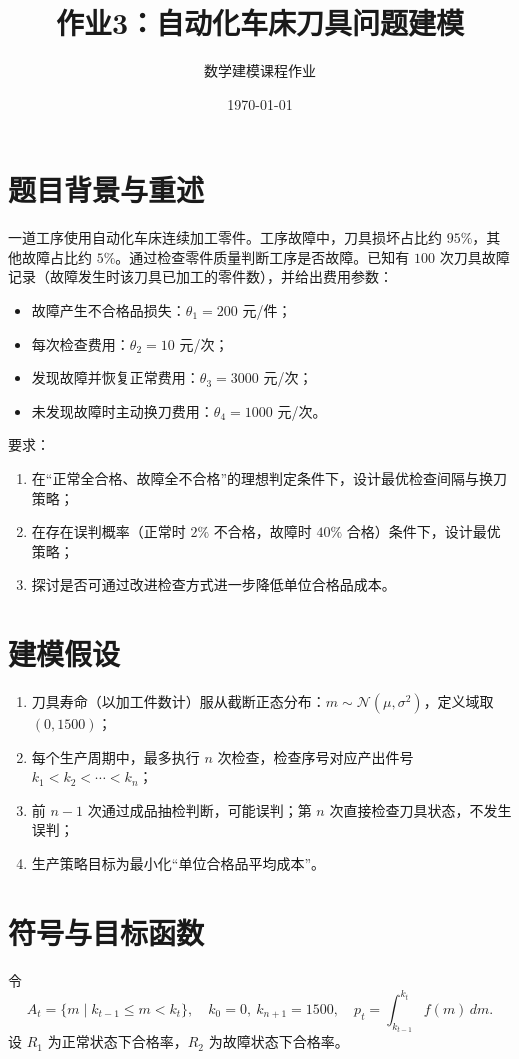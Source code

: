 \documentclass[12pt,a4paper]{ctexart}
\title{作业3：自动化车床刀具问题建模}
\author{数学建模课程作业}
\date{\today}
\begin{document}
\maketitle

\section{题目背景与重述}
一道工序使用自动化车床连续加工零件。工序故障中，刀具损坏占比约 $95\%$，其他故障占比约 $5\%$。通过检查零件质量判断工序是否故障。已知有 $100$ 次刀具故障记录（故障发生时该刀具已加工的零件数），并给出费用参数：
\begin{itemize}
  \item 故障产生不合格品损失：$\theta_1=200$ 元/件；
  \item 每次检查费用：$\theta_2=10$ 元/次；
  \item 发现故障并恢复正常费用：$\theta_3=3000$ 元/次；
  \item 未发现故障时主动换刀费用：$\theta_4=1000$ 元/次。
\end{itemize}

要求：
\begin{enumerate}
  \item 在“正常全合格、故障全不合格”的理想判定条件下，设计最优检查间隔与换刀策略；
  \item 在存在误判概率（正常时 $2\%$ 不合格，故障时 $40\%$ 合格）条件下，设计最优策略；
  \item 探讨是否可通过改进检查方式进一步降低单位合格品成本。
\end{enumerate}

\section{建模假设}
\begin{enumerate}
  \item 刀具寿命（以加工件数计）服从截断正态分布：$m\sim\mathcal N(\mu,\sigma^2)$，定义域取 $(0,1500)$；
  \item 每个生产周期中，最多执行 $n$ 次检查，检查序号对应产出件号 $k_1<k_2<\cdots<k_n$；
  \item 前 $n-1$ 次通过成品抽检判断，可能误判；第 $n$ 次直接检查刀具状态，不发生误判；
  \item 生产策略目标为最小化“单位合格品平均成本”。
\end{enumerate}

\section{符号与目标函数}
令
\[
A_t=\{m\mid k_{t-1}\le m<k_t\},\quad k_0=0,\ k_{n+1}=1500,\quad
p_t=\int_{k_{t-1}}^{k_t}f(m)\,dm.
\]
设 $R_1$ 为正常状态下合格率，$R_2$ 为故障状态下合格率。
\end{document}
